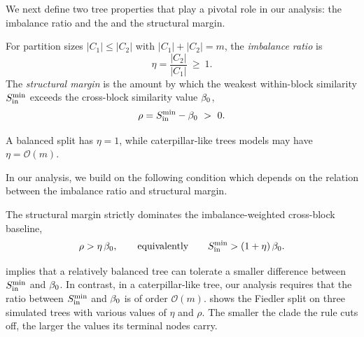 We next define two tree properties that play a pivotal role in our analysis: the imbalance ratio and the and the structural margin.

\begin{definition}\label{def:imbalance}
For partition sizes $|C_1| \le |C_2|$ with $|C_1|+|C_2|=m$, the \emph{imbalance ratio} is
\begin{equation}\label{eq:imbalance_ratio}
   \eta=\frac{|C_2|}{|C_1|}\ \ge\ 1 .
\end{equation}
The \emph{structural margin} is the
amount by which the weakest within-block similarity $S_{\mathrm{in}}^{\min}$ exceeds the cross-block similarity value $\beta_0$,
\begin{equation}\label{eq:margin_definition}
   \rho = S_{\mathrm{in}}^{\min}-\beta_0 \ >\ 0 .
\end{equation}
\end{definition}

\noindent A balanced split has $\eta=1$, while caterpillar-like trees models may have
$\eta=\mathcal{O}(m)$. 

In our analysis, 
we build on the following condition which depends on the relation between the imbalance ratio and structural margin.

\begin{condition}\label{asm:margin}
The structural margin strictly dominates the imbalance-weighted cross-block baseline,
\begin{equation}\label{eq:margin_assumption}
   \rho>\eta\,\beta_0,\qquad\text{equivalently}\qquad
   S_{\mathrm{in}}^{\min}>(1+\eta)\,\beta_0 .
\end{equation}
\end{condition}

 implies that a relatively balanced tree can tolerate a smaller difference between $S_{\mathrm{in}}^{\min}$ and $\beta_0$. In contrast, in a caterpillar-like tree, our analysis requires that the ratio between $S_{\mathrm{in}}^{\min}$ and $\beta_0$ is of order $\mathcal O(m)$.
 shows the Fiedler split on three simulated trees with various values of $\eta$ and $\rho$. The smaller the clade the rule cuts off, the larger the values its terminal nodes carry.

